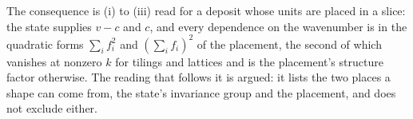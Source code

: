 The consequence is (i) to (iii) read for a deposit whose units are placed in a slice: the state supplies $v - c$ and $c$, and every dependence on the wavenumber is in the quadratic forms $\sum_{i}f_{i}^{2}$ and $(\sum_{i}f_{i})^{2}$ of the placement, the second of which vanishes at nonzero $k$ for tilings and lattices and is the placement's structure factor otherwise. The reading that follows it is argued: it lists the two places a shape can come from, the state's invariance group and the placement, and does not exclude either.
